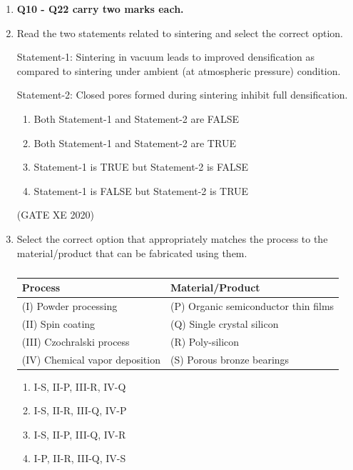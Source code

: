 \documentclass[12pt]{article}
\begin{document}
\begin{enumerate}
(GATE XE 2020)

\item[] \textbf{Q10 - Q22 carry two marks each.}

\item Read the two statements related to sintering and select the correct option.  

Statement-1: Sintering in vacuum leads to improved densification as compared to sintering under ambient (at atmospheric pressure) condition.  

Statement-2: Closed pores formed during sintering inhibit full densification.  

\begin{enumerate}
\item Both Statement-1 and Statement-2 are FALSE  
\item Both Statement-1 and Statement-2 are TRUE  
\item Statement-1 is TRUE but Statement-2 is FALSE  
\item Statement-1 is FALSE but Statement-2 is TRUE  
\end{enumerate}

(GATE XE 2020)

\item Select the correct option that appropriately matches the process to the material/product that can be fabricated using them.  

\begin{table}[H]
\centering
\caption{} \label{}
\begin{tabular}{|l|l|}
\hline
\textbf{Process} & \textbf{Material/Product} \\ \hline
(I) Powder processing      & (P) Organic semiconductor thin films \\ \hline
(II) Spin coating          & (Q) Single crystal silicon \\ \hline
(III) Czochralski process  & (R) Poly-silicon \\ \hline
(IV) Chemical vapor deposition & (S) Porous bronze bearings \\ \hline
\end{tabular}
\end{table}

\begin{enumerate}
\item I-S, II-P, III-R, IV-Q  
\item I-S, II-R, III-Q, IV-P  
\item I-S, II-P, III-Q, IV-R  
\item I-P, II-R, III-Q, IV-S  
\end{enumerate}


\end{enumerate}
\end{document}
